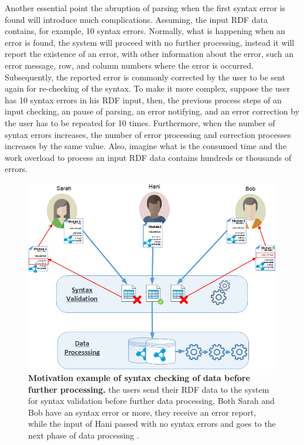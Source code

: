 Another essential point the abruption of parsing when the first syntax error is found will introduce much complications. Assuming, the input RDF data contains, for example, 10 syntax errors. Normally, what is happening when an error is found, the system will proceed with no further processing, instead it will report the existence of an error, with other information about the error, such an error message, row, and column numbers where the error is occurred. Subsequently, the reported error is commonly corrected by the user to be sent again for re-checking of the syntax. To make it more complex, suppose the user has 10 syntax errors in his RDF input, then, the previous process steps of an input checking, an pause of parsing, an error notifying, and an error correction by the user has to be repeated for 10 times.  Furthermore, when the number of syntax errors increases, the number of error processing and correction processes increases by the same value. Also, imagine what is the consumed time and the work overload to process an input RDF data contains hundreds or thousands of errors.  

	\begin{figure}[ht]
		\begin{center}
			\includegraphics[scale=0.6,angle=0]{images/motivation.png}
			\setlength\belowcaptionskip{-7mm}
			\caption{\textbf{Motivation example of syntax checking of data before further processing.} the users send their RDF data to the system for syntax validation before further data processing, Both Sarah and Bob have an syntax error or more, they receive an error report, while the input of Hani passed with no syntax errors and goes to the next phase of data processing . }
			\label{Fig:Motivation}
		\end{center}
	\end{figure}

